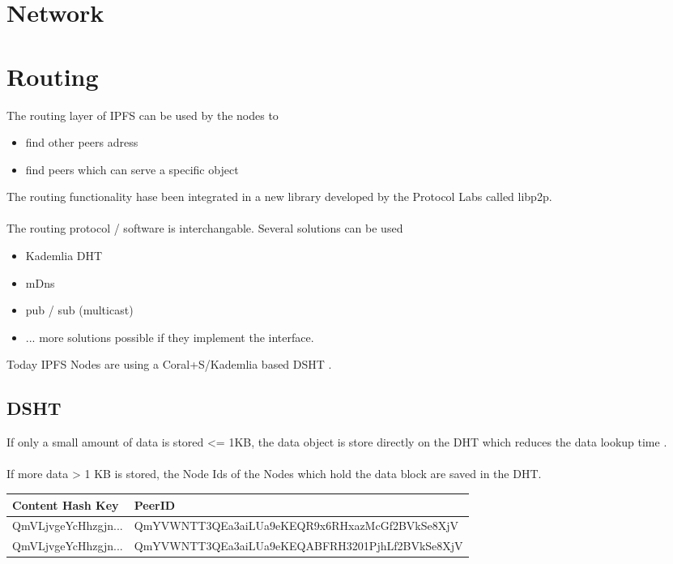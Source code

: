 \documentclass[a4paper,11pt, oneside]{report}
\theoremstyle{definition}
\begin{document}
\newpage
\section{Network}

\newpage
\section{Routing}
The routing layer of IPFS can be used by the nodes to
\begin{itemize}
\item find other peers adress
\item find peers which can serve a specific object
\end{itemize}
The routing functionality hase been integrated in a new library developed by the Protocol Labs called libp2p.\\ \\
The routing protocol / software is interchangable. Several solutions can be used 
\begin{itemize}
\item Kademlia DHT
\item mDns
\item pub / sub (multicast) 
\item ... more solutions possible if they implement the interface.
\end{itemize}
Today IPFS Nodes are using a Coral+S/Kademlia based DSHT \cite{Routing}.
\subsection{DSHT}
If only a small amount of data is stored <= 1KB, the data object is store directly on the DHT which reduces the data lookup time \cite{Whitepaper}.\\ \\
If more data  > 1 KB is stored, the Node Ids of the Nodes which hold the data block are saved in the DHT.
\\[0.6cm]
\begin{tabularx}{\textwidth}{lX}
Content Hash Key & PeerID \\ \hline
QmVLjvgeYcHhzgjn... & QmYVWNTT3QEa3aiLUa9eKEQR9x6RHxazMcGf2BVkSe8XjV\\
QmVLjvgeYcHhzgjn... & QmYVWNTT3QEa3aiLUa9eKEQABFRH3201PjhLf2BVkSe8XjV
\end{tabularx}
\\[0.6cm]
\newpage
\end{document}
